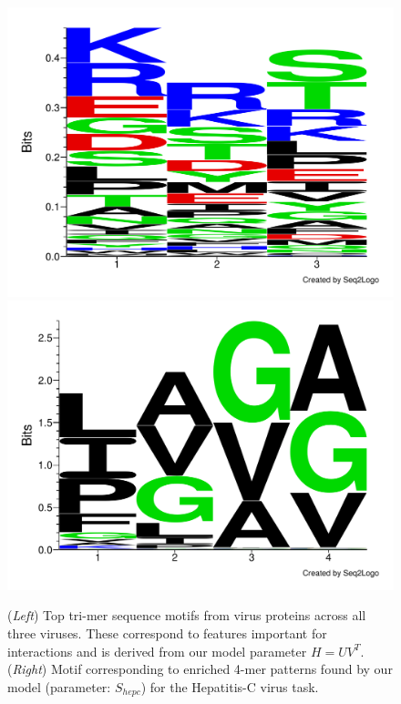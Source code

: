 \documentclass[a4paper,11pt]{article}
\begin{document}
\begin{figure}
\includegraphics[scale=0.165, trim = 0 0.8cm 0 0]{fig4-eps-converted-to.pdf}
\includegraphics[scale=0.165, trim = 0 0 0 0]{fig8-eps-converted-to.pdf}
\caption{(\textit{Left}) Top tri-mer sequence motifs from virus proteins across all three viruses. These correspond to features important for interactions and is derived from our model parameter $H = U V^{T}$. (\textit{Right}) Motif corresponding to enriched 4-mer patterns found by our model (parameter: $S_{hepc}$) for the Hepatitis-C virus task.}%
\label{fig:virus_motifs}
\end{figure}
\end{document}
